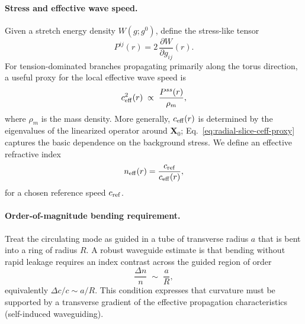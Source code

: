 \paragraph{Stress and effective wave speed.}
Given a stretch energy density $W(g;g^0)$, define the stress-like tensor
\begin{equation}
P^{ij}(r)=2\,\frac{\partial W}{\partial g_{ij}}(r).
\label{eq:radial-slice-stress}
\end{equation}
For tension-dominated branches propagating primarily along the torus direction, a useful proxy for
the local effective wave speed is
\begin{equation}
c_{\rm eff}^2(r)\;\propto\;\frac{P^{ss}(r)}{\rho_m},
\label{eq:radial-slice-ceff-proxy}
\end{equation}
where $\rho_m$ is the mass density. More generally, $c_{\rm eff}(r)$ is determined by the eigenvalues
of the linearized operator around $\mathbf X_0$; Eq.~\eqref{eq:radial-slice-ceff-proxy} captures the
basic dependence on the background stress. We define an effective refractive index
\begin{equation}
n_{\rm eff}(r)=\frac{c_{\rm ref}}{c_{\rm eff}(r)},
\label{eq:radial-slice-neff}
\end{equation}
for a chosen reference speed $c_{\rm ref}$.

\paragraph{Order-of-magnitude bending requirement.}
Treat the circulating mode as guided in a tube of transverse radius $a$ that is bent into a ring of
radius $R$. A robust waveguide estimate is that bending without rapid leakage requires an index
contrast across the guided region of order
\begin{equation}
\frac{\Delta n}{n}\;\sim\;\frac{a}{R},
\label{eq:radial-slice-bend-criterion}
\end{equation}
equivalently $\Delta c/c\sim a/R$. This condition expresses that curvature must be supported by a
transverse gradient of the effective propagation characteristics (self-induced waveguiding).

